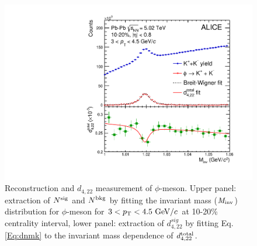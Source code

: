 \begin{figure}[!htb]
\begin{center}
\includegraphics[scale=0.45]{figures/analysisMethod/flowmass_Phi.pdf}
\end{center}
\caption{Reconstruction and $d_{4,22}$ measurement of $\phi$-meson. Upper panel: extraction of $N^{\rm{sig}}$ and $N^{\rm{bkg}}$ by fitting the invariant mass (${\it M}_{\rm{inv}}$) distribution for $\phi$-meson for $3<p_{\rm{T}}<4.5~{\rm GeV}/c$ at 10-20\% centrality interval, lower panel: extraction of $d_{4,22}^{sig}$ by fitting Eq. \ref{Eq:dnmk} to the invariant mass dependence of $d_{4,22}^{\rm total}$.}
\label{d422_phi_meson}
\end{figure}


